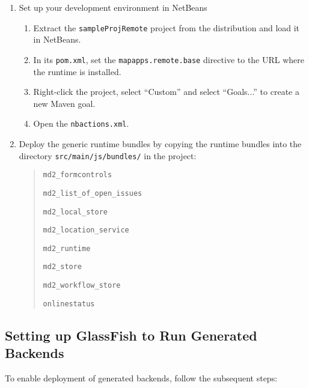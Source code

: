 \begin{enumerate}
\item {Set up your \mapapps  development environment in NetBeans}

\begin{enumerate}
\item Extract the \lstinline|sampleProjRemote| project from the \mapapps distribution and load it in NetBeans. \label{item:extraction}
\item In its \lstinline|pom.xml|,
 set the \lstinline|mapapps.remote.base| directive to the URL where the \mapapps runtime is installed.
\item Right-click the project, select \enquote{Custom} and select \enquote{Goals...} to create a new Maven goal. 
\item Open the \lstinline|nbactions.xml|. 

\end{enumerate}

\item Deploy the generic \MD runtime bundles by copying the \MD runtime bundles into the directory \lstinline[language=Simple]|src/main/js/bundles/| in the project:
	\begin{quotation}
		 \lstinline|md2_formcontrols|
		 
		 \lstinline|md2_list_of_open_issues|
		 
		 \lstinline|md2_local_store|
		 
		 \lstinline|md2_location_service|
		 
		 \lstinline|md2_runtime|
		 		 
		 \lstinline|md2_store|
		 
		 \lstinline|md2_workflow_store|
		 
		 \lstinline|onlinestatus|
	\end{quotation}



\end{enumerate}

\subsection{Setting up GlassFish to Run Generated Backends}
To enable deployment of generated backends, follow the subsequent steps:



